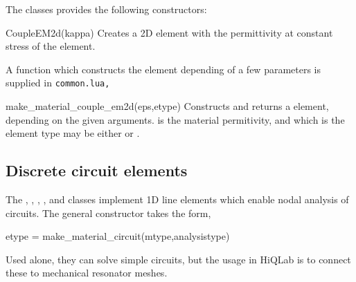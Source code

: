 The classes provides the following constructors:
\begin{codelist}
  \item[CoupleEM2d(kappa)] Creates a 2D element with  the 
  permittivity at constant stress of the element.
\end{codelist}

A function which constructs the element depending of a 
few parameters is supplied in \tt{common.lua},
\begin{codelist}
  \item[make\_material\_couple\_em2d(eps,etype)]
    Constructs and returns a  element, depending on the
    given arguments.  is the material permitivity,
    and  which is the element type may be either 
     or .
\end{codelist}

\clearpage
\subsection{Discrete circuit elements}
The , , , , and
 classes implement 1D line elements which enable nodal
analysis of circuits. 
The general constructor takes the form,
\begin{codelist}
  \item[etype = make\_material\_circuit(mtype,analysistype)]
\end{codelist}
Used alone, they can solve simple circuits, but
the usage in HiQLab is to connect these to mechanical resonator meshes.

